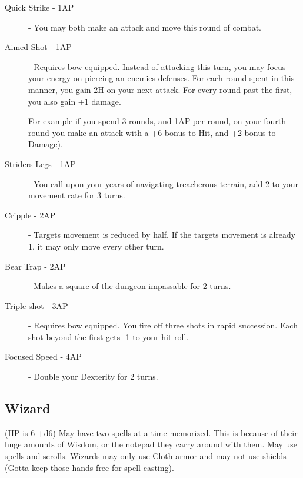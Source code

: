 \documentclass[a6paper,hidelinks]{article}
\begin{document}
\begin{description}

\item[Quick Strike - 1AP] - You may both make an attack and move this round of combat.

\item[Aimed Shot - 1AP] - Requires bow equipped. Instead of attacking this turn, you may focus your energy on piercing an enemies defenses. For each round spent in this manner, you gain 2H on your next attack. For every round past the first, you also gain +1 damage.

For example if you spend 3 rounds, and 1AP per round, on your fourth round you make an attack with a +6 bonus to Hit, and +2 bonus to Damage).

\item[Striders Legs - 1AP] - You call upon your years of navigating treacherous terrain, add 2 to your movement rate for 3 turns.

\item[Cripple - 2AP] - Targets movement is reduced by half. If the targets movement is already 1, it may only move every other turn.

\item[Bear Trap - 2AP] - Makes a square of the dungeon impassable for 2 turns.

\item[Triple shot - 3AP] - Requires bow equipped. You fire off three shots in rapid succession. Each shot beyond the first gets -1 to your hit roll.

\item[Focused Speed - 4AP] - Double your Dexterity for 2 turns.

\end{description}

\subsection{Wizard}

(HP is 6 +d6) May have two spells at a time memorized. This is because of their huge amounts of Wisdom, or the notepad they carry around with them. May use spells and scrolls. Wizards may only use Cloth armor and may not use shields (Gotta keep those hands free for spell casting).
\end{document}
